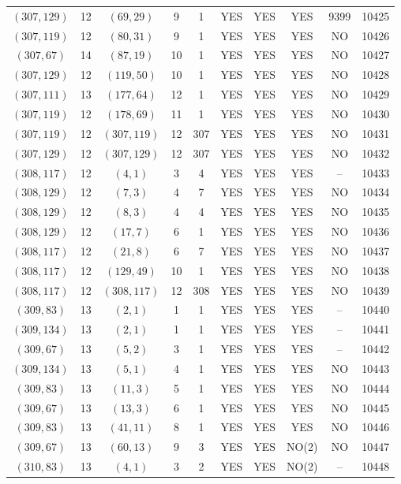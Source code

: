 \begin{longtable}{|c|c|c|c|c|c|c|c|c|c|}
$(307, 129)$ & 12 & $(69, 29)$ & 9 & 1 & YES & YES & YES & 9399 & 10425\\
$(307, 119)$ & 12 & $(80, 31)$ & 9 & 1 & YES & YES & YES & NO & 10426\\
$(307, 67)$ & 14 & $(87, 19)$ & 10 & 1 & YES & YES & YES & NO & 10427\\
$(307, 129)$ & 12 & $(119, 50)$ & 10 & 1 & YES & YES & YES & NO & 10428\\
$(307, 111)$ & 13 & $(177, 64)$ & 12 & 1 & YES & YES & YES & NO & 10429\\
$(307, 119)$ & 12 & $(178, 69)$ & 11 & 1 & YES & YES & YES & NO & 10430\\
$(307, 119)$ & 12 & $(307, 119)$ & 12 & 307 & YES & YES & YES & NO & 10431\\
$(307, 129)$ & 12 & $(307, 129)$ & 12 & 307 & YES & YES & YES & NO & 10432\\
$(308, 117)$ & 12 & $(4, 1)$ & 3 & 4 & YES & YES & YES & -- & 10433\\
$(308, 129)$ & 12 & $(7, 3)$ & 4 & 7 & YES & YES & YES & NO & 10434\\
$(308, 129)$ & 12 & $(8, 3)$ & 4 & 4 & YES & YES & YES & NO & 10435\\
$(308, 129)$ & 12 & $(17, 7)$ & 6 & 1 & YES & YES & YES & NO & 10436\\
$(308, 117)$ & 12 & $(21, 8)$ & 6 & 7 & YES & YES & YES & NO & 10437\\
$(308, 117)$ & 12 & $(129, 49)$ & 10 & 1 & YES & YES & YES & NO & 10438\\
$(308, 117)$ & 12 & $(308, 117)$ & 12 & 308 & YES & YES & YES & NO & 10439\\
$(309, 83)$ & 13 & $(2, 1)$ & 1 & 1 & YES & YES & YES & -- & 10440\\
$(309, 134)$ & 13 & $(2, 1)$ & 1 & 1 & YES & YES & YES & -- & 10441\\
$(309, 67)$ & 13 & $(5, 2)$ & 3 & 1 & YES & YES & YES & -- & 10442\\
$(309, 134)$ & 13 & $(5, 1)$ & 4 & 1 & YES & YES & YES & NO & 10443\\
$(309, 83)$ & 13 & $(11, 3)$ & 5 & 1 & YES & YES & YES & NO & 10444\\
$(309, 67)$ & 13 & $(13, 3)$ & 6 & 1 & YES & YES & YES & NO & 10445\\
$(309, 83)$ & 13 & $(41, 11)$ & 8 & 1 & YES & YES & YES & NO & 10446\\
$(309, 67)$ & 13 & $(60, 13)$ & 9 & 3 & YES & YES & NO(2) & NO & 10447\\
$(310, 83)$ & 13 & $(4, 1)$ & 3 & 2 & YES & YES & NO(2) & -- & 10448\\

\end{longtable}
